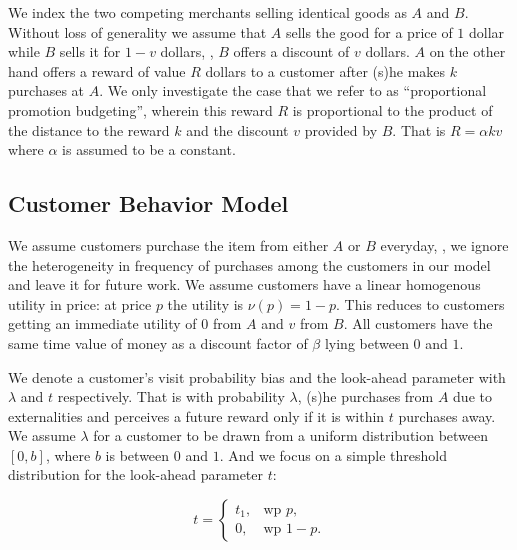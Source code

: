 We index the two competing merchants selling identical goods as $A$ and $B$.
Without loss of generality we assume that $A$ sells the good for a price of $1$ dollar while $B$ sells it for $1-v$ dollars, \ie, $B$ offers a discount of $v$ dollars. 
$A$ on the other hand offers a reward of value $R$ dollars to a customer after (s)he makes $k$ purchases at $A$. 
We only investigate the case that we refer to as ``proportional promotion budgeting'', wherein this reward $R$ is proportional to the product of the distance to the reward $k$ and the discount $v$ provided by $B$.
That is $R = \alpha k v$ where $\alpha$ is assumed to be a constant.

\subsection{Customer Behavior Model}
We assume customers purchase the item from either $A$ or $B$ everyday, \ie, we ignore the heterogeneity in frequency of purchases among the customers in our model and leave it for future work.
We assume customers have a linear homogenous utility in price: at price $p$ the utility is $\nu(p) = 1-p$. 
This reduces to customers getting an immediate utility of $0$ from $A$ and $v$ from $B$.
All customers have the same time value of money as a discount factor of $\beta$ lying between $0$ and $1$.

We denote a customer's visit probability bias and the look-ahead parameter with $\lambda$ and $t$ respectively. 
That is with probability $\lambda$, (s)he purchases from $A$ due to externalities and perceives a future reward only if it is within $t$ purchases away. 
We assume $\lambda$ for a customer to be drawn from a uniform distribution between $[0,b]$, where $b$ is between $0$ and $1$.
And we focus on a simple threshold distribution for the look-ahead parameter $t$: 

\begin{equation*}
  t=\begin{cases}
    t_1, & \text{wp } p,\\
    0, & \text{wp } 1-p.
  \end{cases}
\end{equation*}


